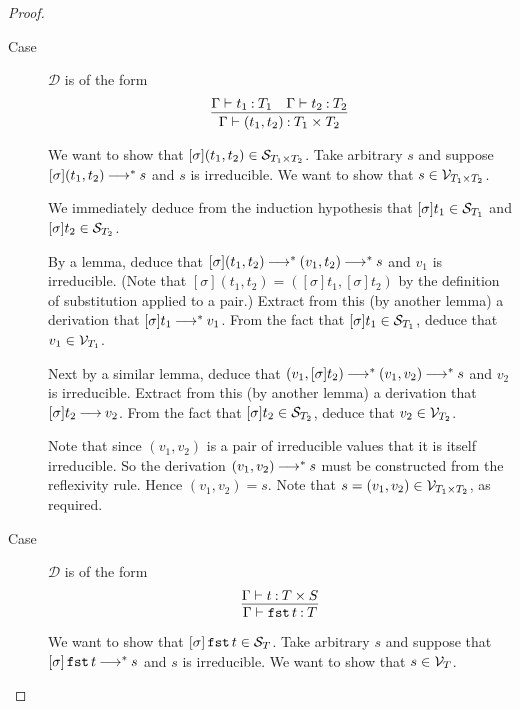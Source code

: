 \documentclass[11pt,letterpaper]{article}
\newcommand{\fst}{\operatorname{\mathtt{fst}}}
\begin{document}
\begin{proof}
  \begin{description}
    \item[Case] $\mathcal{D}$ is of the form
      \begin{equation*}
        \infer{\Gamma \proves (t_1, t_2) \hastype T_1 \times T_2}{
          \Gamma \proves t_1 \hastype T_1
          &
          \Gamma \proves t_2 \hastype T_2
        }
      \end{equation*}
      \newcommand{\s}{\ensuremath{[\sigma]}}

      We want to show that $\s (t_1, t_2) \in \S_{T_1 \times T_2}$.
      Take arbitrary $s$ and suppose $\s (t_1, t_2) \evalto^* s$ and $s$ is
      irreducible.
      We want to show that $s \in \mathcal{V}_{T_1 \times T_2}$.

      We immediately deduce from the induction hypothesis that
      $\s t_1 \in \S_{T_1}$ and $\s t_2 \in \S_{T_2}$.

      By a lemma\footnotemark,
      deduce that $\s (t_1, t_2) \evalto^* (v_1, t_2) \evalto^* s$ and $v_1$ is
      irreducible.
      (Note that $\s (t_1, t_2) = (\s t_1, \s t_2)$ by the definition of
      substitution applied to a pair.)
      Extract from this (by another lemma) a derivation that
      $\s t_1 \evalto^* v_1$.
      From the fact that $\s t_1 \in \S_{T_1}$,
      deduce that $v_1 \in \mathcal{V}_{T_1}$.

      Next by a similar lemma,
      deduce that $(v_1, \s t_2) \evalto^* (v_1, v_2) \evalto^* s$ and $v_2$ is
      irreducible.
      Extract from this (by another lemma) a derivation that
      $\s t_2 \evalto v_2$.
      From the fact that $\s t_2 \in \S_{T_2}$,
      deduce that $v_2 \in \mathcal{V}_{T_2}$.

      Note that since $(v_1, v_2)$ is a pair of irreducible values that it is
      itself irreducible. So the derivation $(v_1, v_2) \mathbin{\longrightarrow}^* s$ must be
      constructed from the reflexivity rule. Hence $(v_1, v_2) = s$.
      Note that $s = (v_1, v_2) \in \mathcal{V}_{T_1 \times T_2}$, as required.

    \item[Case] $\mathcal{D}$ is of the form
      \begin{equation*}
        \infer{\Gamma \proves \fst t \hastype T}{
          \Gamma \proves t \hastype T \times S
        }
      \end{equation*}

      We want to show that $\s \fst t \in \S_T$.
      Take arbitrary $s$ and suppose that $\s \fst t \evalto^* s$ and $s$ is
      irreducible.
      We want to show that $s \in \mathcal{V}_T$.


\end{description}
\end{proof}
\end{document}
